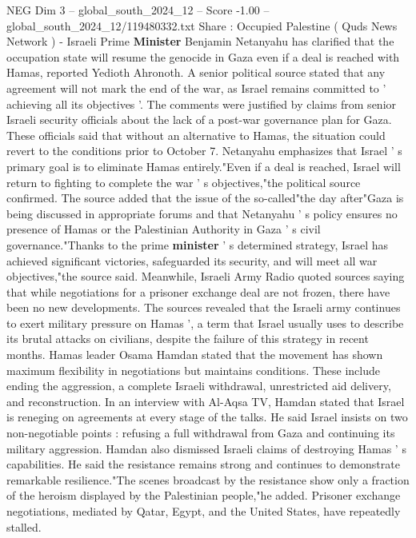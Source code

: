 \begin{textsample}{NEG Dim 3 – global\_south\_2024\_12 – Score -1.00 – global\_south\_2024\_12/119480332.txt}  \label{ex:f3_neg_063}
Share : Occupied Palestine ( Quds News Network ) - Israeli Prime \textbf{Minister} Benjamin Netanyahu has clarified that the occupation state will resume the genocide in Gaza even if a deal is reached with Hamas, reported Yedioth Ahronoth.
A senior political source stated that any agreement will not mark the end of the war, as Israel remains committed to ' achieving all its objectives '.
The comments were justified by claims from senior Israeli security officials about the lack of a post-war governance plan for Gaza.
These officials said that without an alternative to Hamas, the situation could revert to the conditions prior to October 7.
Netanyahu emphasizes that Israel ' s primary goal is to eliminate Hamas entirely."Even if a deal is reached, Israel will return to fighting to complete the war ' s objectives,"the political source confirmed.
The source added that the issue of the so-called"the day after"Gaza is being discussed in appropriate forums and that Netanyahu ' s policy ensures no presence of Hamas or the Palestinian Authority in Gaza ' s civil governance."Thanks to the prime \textbf{minister} ' s determined strategy, Israel has achieved significant victories, safeguarded its security, and will meet all war objectives,"the source said.
Meanwhile, Israeli Army Radio quoted sources saying that while negotiations for a prisoner exchange deal are not frozen, there have been no new developments.
The sources revealed that the Israeli army continues to exert military pressure on Hamas ', a term that Israel usually uses to describe its brutal attacks on civilians, despite the failure of this strategy in recent months.
Hamas leader Osama Hamdan stated that the movement has shown maximum flexibility in negotiations but maintains conditions.
These include ending the aggression, a complete Israeli withdrawal, unrestricted aid delivery, and reconstruction.
In an interview with Al-Aqsa TV, Hamdan stated that Israel is reneging on agreements at every stage of the talks.
He said Israel insists on two non-negotiable points : refusing a full withdrawal from Gaza and continuing its military aggression.
Hamdan also dismissed Israeli claims of destroying Hamas ' s capabilities.
He said the resistance remains strong and continues to demonstrate remarkable resilience."The scenes broadcast by the resistance show only a fraction of the heroism displayed by the Palestinian people,"he added.
Prisoner exchange negotiations, mediated by Qatar, Egypt, and the United States, have repeatedly stalled.

\end{textsample}
